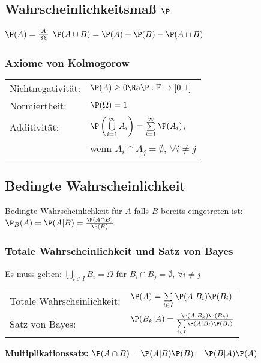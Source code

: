 \documentclass[english]{latex4ei/latex4ei_sheet}
\begin{document}
\begin{sectionbox}
	\subsection{Wahrscheinlichkeitsmaß $\P$}
	$\P(A) = \frac{|A|}{|\Omega|}$ \hfill $\P(A \cup B) = \P(A) + \P(B) - \P(A \cap B)$\\
	\subsubsection{Axiome von Kolmogorow}
	\begin{tabular}{ll}
		Nichtnegativität: & $\P(A) \geq 0 \Ra \P:\mathbb F \mapsto [0,1]$ \\
		Normiertheit: & $\P(\Omega) = 1$ \\
		Additivität: & $\P\left(\bigcup\limits_{i=1}^{\infty} A_i \right) = \sum\limits_{i=1}^{\infty} \P(A_i)$, \\
		& wenn $A_i \cap A_j = \emptyset$, $\forall i \neq j$ \\
	\end{tabular}
\end{sectionbox}

\begin{sectionbox}
	\subsection{Bedingte Wahrscheinlichkeit}
	Bedingte Wahrscheinlichkeit für $A$ falls $B$ bereits eingetreten ist:\\
	$\P_B(A) = \P(A|B) = \frac{\P(A \cap B)}{\P(B)}$ %

	\subsubsection{Totale Wahrscheinlichkeit und Satz von Bayes}
	Es muss gelten: $\bigcup\limits_{i \in I} B_i = \Omega$ für $B_i \cap B_j = \emptyset$, $\forall i \neq j$ \\
	\begin{tabular}{ll}
		Totale Wahrscheinlichkeit: & $\P(A) = \sum\limits_{i \in I} \P(A|B_i)\P(B_i)$\\
		Satz von Bayes: & $\P(B_k | A) = \frac{\P(A | B_k)\P(B_k)}{\sum\limits_{i \in I} \P(A|B_i) \P(B_i)}$\\
	\end{tabular}

	\textbf{Multiplikationssatz:} 	$\P(A \cap B) = \P(A|B)\P(B) = \P(B|A)\P(A)$
\end{sectionbox}
\end{document}
